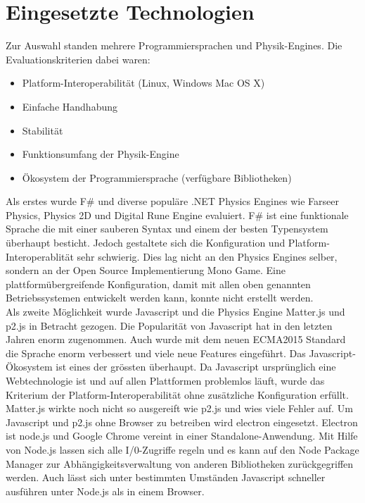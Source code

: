   \section{Eingesetzte Technologien\label{sec:Technology}}

    Zur Auswahl standen mehrere Programmiersprachen und Physik-Engines.
    Die Evaluationskriterien dabei waren:
    \begin{itemize}
      \item Platform-Interoperabilität (Linux, Windows Mac OS X)
      \item Einfache Handhabung
      \item Stabilität
      \item Funktionsumfang der Physik-Engine
      \item Ökosystem der Programmiersprache (verfügbare Bibliotheken)
    \end{itemize}

    Als erstes wurde F\# und diverse populäre .NET Physics Engines wie Farseer Physics,
    Physics 2D und Digital Rune Engine evaluiert.
    F\# ist eine funktionale Sprache die mit einer sauberen Syntax und einem der besten Typensystem überhaupt besticht.
    Jedoch gestaltete sich die Konfiguration und Platform-Interoperablität sehr schwierig.
    Dies lag nicht an den Physics Engines selber, sondern an der Open Source Implementierung Mono Game.
    Eine plattformübergreifende Konfiguration,
    damit mit allen oben genannten Betriebssystemen entwickelt werden kann,
    konnte nicht erstellt werden.
    \\
    Als zweite Möglichkeit wurde Javascript und die Physics Engine Matter.js und p2.js in Betracht gezogen.
    Die Popularität von Javascript hat in den letzten Jahren enorm zugenommen.
    Auch wurde mit dem neuen ECMA2015 Standard die Sprache enorm verbessert und viele neue Features eingeführt.
    Das Javascript-Ökosystem ist eines der grössten überhaupt.
    Da Javascript ursprünglich eine Webtechnologie ist und auf allen Plattformen problemlos läuft,
    wurde das Kriterium der Platform-Interoperabilität ohne zusätzliche Konfiguration erfüllt.
    Matter.js wirkte noch nicht so ausgereift wie p2.js und wies viele Fehler auf.
    Um Javascript und p2.js ohne Browser zu betreiben wird electron eingesetzt.
    Electron ist node.js und Google Chrome vereint in einer Standalone-Anwendung.
    Mit Hilfe von Node.js lassen sich alle I/0-Zugriffe regeln und es kann auf den
    Node Package Manager zur Abhängigkeitsverwaltung von anderen Bibliotheken zurückgegriffen werden.
    Auch lässt sich unter bestimmten Umständen Javascript schneller ausführen unter Node.js als in einem Browser.


